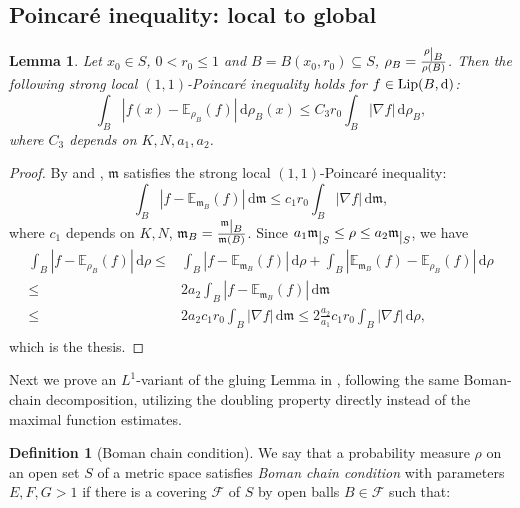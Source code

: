 \documentclass[a4paper,11pt]{article}
\numberwithin{equation}{section}
\theoremstyle{plain}
\newtheorem{lemma}[theorem]{Lemma}
\theoremstyle{definition}
\newtheorem{definition}[theorem]{Definition}
\theoremstyle{remark}
\newcommand{\mm}{\mathfrak m}
\newcommand{\E}{\mathbb{E}}
\newcommand{\Lip}{\mathop{\rm Lip}\nolimits}
\renewcommand{\d}{{\mathrm d}}
\newcommand{\restr}[1]{\lower3pt\hbox{$|_{#1}$}}
\begin{document}
	
	\begin{appendices}
	\section{Poincar\'e inequality: local to global}\label{A}
		\begin{lemma}\label{p3.10}
	Let $x_0\in S$, $0<r_0\leq1$ and  $B=B(x_0,r_0)\subseteq S$,  $\rho_B=\frac{\rho\restr{B}}{\rho(B)}$.  Then the following strong local $(1,1)$-Poincar\'e inequality holds for $f\in \Lip(B,  \d)$:
			\begin{equation}
			\int_{B}|f(x)-\E_{\rho_B}(f)|\,\d\rho_B(x)\leq C_3 r_0\int_B |\nabla f|\,\d\rho_B,
		\end{equation}
		where $C_3$ depends on $K,N,a_1,a_2$.
	\end{lemma}
	
	\begin{proof}
		By \cite[Chapter 9]{zbMATH01474795} and \cite[Remark 3.3]{zbMATH06043352},  $\mm$ satisfies the strong local  $(1,1)$-Poincar\'e inequality:
		\begin{equation}
			\int_{B} |f-\E_{\mm_B}(f)|\,\d\mm\leq c_1 r_0 \int_B |\nabla f|\,\d\mm,
		\end{equation}
		where $c_1$ depends on $K,N$, $\mm_B=\frac{\mm\restr{B}}{\mm(B)}$. Since $a_1\mm\restr{S} \leq \rho\leq a_2\mm\restr{S}$, we have 
		\begin{equation}
			\begin{aligned}
				\int_{B} |f-\E_{\rho_B}(f)|\,\d\rho\leq &\int_{B} |f-\E_{\mm_B}(f)|\,\d\rho+\int_{B} |\E_{\mm_B}(f)-\E_{\rho_B}(f)|\,\d\rho\\
				\leq & 2a_2\int_{B} |f-\E_{\mm_B}(f)|\,\d\mm\\
				\leq &2a_2 c_1 r_0 \int_B |\nabla f|\,\d\mm
				\leq  2\frac{a_2}{a_1}c_1 r_0 \int_B |\nabla f|\,\d\rho,\\
			\end{aligned}
		\end{equation}
	which is the thesis.
	\end{proof}
	
	Next we prove an $L^1$-variant of the gluing Lemma in \cite[Lemma 3.3]{arXiv:2411.04908},   following the same Boman-chain decomposition,  utilizing the doubling property directly instead of the maximal function estimates. 
	
		\begin{definition}[Boman chain condition]\label{Boman chain condition}
		We say that a probability measure $\rho$ on an open set $S$ of a metric space satisfies  \emph{Boman chain condition} with parameters \(E, F,G>1\) if there is a covering \(\mathcal{F}\) of $S$ by open balls  $B \in \mathcal{F}$ such that:
	

\end{definition}
\end{appendices}
\end{document}

